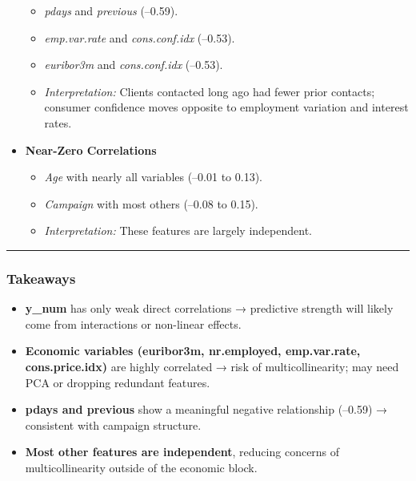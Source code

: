 \documentclass[
]{article}
\providecommand{\tightlist}{%
  \setlength{\itemsep}{0pt}\setlength{\parskip}{0pt}}
\begin{document}
\begin{itemize}
  \begin{itemize}
  \tightlist
  \item
    \emph{pdays} and \emph{previous} (--0.59).\\
  \item
    \emph{emp.var.rate} and \emph{cons.conf.idx} (--0.53).\\
  \item
    \emph{euribor3m} and \emph{cons.conf.idx} (--0.53).\\
  \item
    \emph{Interpretation:} Clients contacted long ago had fewer prior
    contacts; consumer confidence moves opposite to employment variation
    and interest rates.
  \end{itemize}
\item
  \textbf{Near-Zero Correlations}

  \begin{itemize}
  \tightlist
  \item
    \emph{Age} with nearly all variables (--0.01 to 0.13).\\
  \item
    \emph{Campaign} with most others (--0.08 to 0.15).\\
  \item
    \emph{Interpretation:} These features are largely independent.
  \end{itemize}
\end{itemize}

\begin{center}\rule{0.5\linewidth}{0.5pt}\end{center}

\subsubsection{Takeaways}\label{takeaways}

\begin{itemize}
\tightlist
\item
  \textbf{y\_num} has only weak direct correlations → predictive
  strength will likely come from interactions or non-linear effects.\\
\item
  \textbf{Economic variables (euribor3m, nr.employed, emp.var.rate,
  cons.price.idx)} are highly correlated → risk of multicollinearity;
  may need PCA or dropping redundant features.\\
\item
  \textbf{pdays and previous} show a meaningful negative relationship
  (--0.59) → consistent with campaign structure.\\
\item
  \textbf{Most other features are independent}, reducing concerns of
  multicollinearity outside of the economic block.
\end{itemize}
\end{document}
